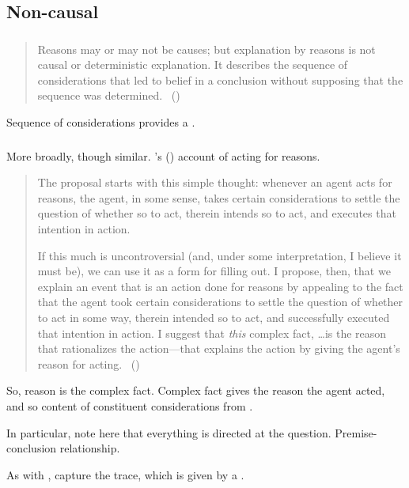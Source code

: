 \subsection{Non-causal}
\label{sec:non-causal}

\subsubsection{\textcite{Harman:1973ww}}

\begin{note}
  \begin{quote}
    Reasons may or may not be causes; but explanation by reasons is not causal or deterministic explanation.
    It describes the sequence of considerations that led to belief in a conclusion without supposing that the sequence was determined.%
    \mbox{ }\hfill\mbox{(\citeyear[52]{Harman:1973ww})}
  \end{quote}

  Sequence of considerations provides a \wit{}.
\end{note}

\subsubsection{\textcite{Hieronymi:2011aa}}

\begin{note}
  More broadly, though similar.
  \citeauthor{Hieronymi:2011aa}'s (\citeyear{Hieronymi:2011aa}) account of acting for reasons.

  \begin{quote}
    The proposal starts with this simple thought: whenever an agent acts for reasons, the agent, in some sense, takes certain considerations to settle the question of whether so to act, therein intends so to act, and executes that intention in action.

    If this much is uncontroversial (and, under some interpretation, I believe it must be), we can use it as a form for filling out.
    I propose, then, that we explain an event that is an action done for reasons by appealing to the fact that the agent took certain considerations to settle the question of whether to act in some way, therein intended so to act, and successfully executed that intention in action.
    I suggest that \emph{this} complex fact, \dots is the reason that rationalizes the action---that explains the action by giving the agent’s reason for acting.\newline
    \mbox{ }\hfill\mbox{(\citeyear[431]{Hieronymi:2011aa})}
  \end{quote}

  So, reason is the complex fact.
  Complex fact gives the reason the agent acted, and so content of constituent considerations from \agpe{}.

  In particular, note here that everything is directed at the question.
  Premise-conclusion relationship.

  As with \citeauthor{Harman:1973ww}, capture the trace, which is given by a \wit{}.
\end{note}


